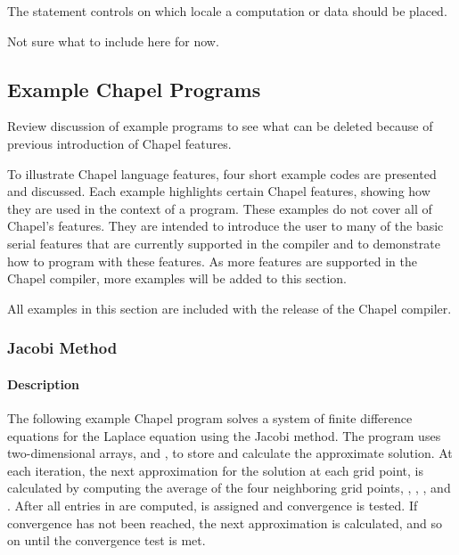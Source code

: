 The  statement controls on which locale a computation or data
should be placed.

\begin{TODO}
Not sure what to include here for now.  
\end{TODO}

\subsection{Example Chapel Programs}

\begin{TODO}
Review discussion of example programs to see what can be deleted because
of previous introduction of Chapel features.
\end{TODO}

To illustrate Chapel language features, four short example codes are presented and
discussed.  Each example highlights certain Chapel features, showing how they are used
in the context of a program.  These examples do not cover all of Chapel's features.
They are intended to introduce the user to many of the basic serial features that are
currently supported in the compiler and to demonstrate how to program with 
these features.  As more features are supported in the Chapel compiler, more 
examples will be added to this section.

All examples in this section are included with the release of the Chapel compiler.

\subsubsection{Jacobi Method}

\paragraph{Description}
The following example Chapel program solves a system of finite difference
equations for the Laplace equation using the Jacobi method.  The program uses
two-dimensional arrays,  and , to store and calculate the approximate
solution.  At each iteration, the next approximation for the solution at 
each grid point,  is calculated by computing the average of 
the four neighboring grid points,
, , , and .  
After all entries in  are computed,  is assigned 
and convergence is tested.  If convergence has not been reached, the next
approximation is calculated, and so on until the convergence test is met.

